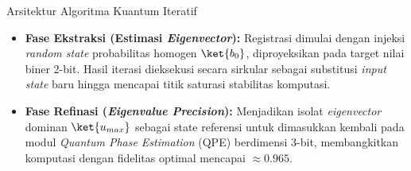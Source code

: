 \begin{frame}{Arsitektur Algoritma Kuantum Iteratif}
    \begin{itemize}
        \item \textbf{Fase Ekstraksi (Estimasi \textit{Eigenvector}):} Registrasi dimulai dengan injeksi \textit{random state} probabilitas homogen $\ket{b_0}$, diproyeksikan pada target nilai biner 2-bit. Hasil iterasi dieksekusi secara sirkular sebagai substitusi \textit{input state} baru hingga mencapai titik saturasi stabilitas komputasi.
        \item \textbf{Fase Refinasi (\textit{Eigenvalue Precision}):} Menjadikan isolat \textit{eigenvector} dominan $\ket{u_{max}}$ sebagai state referensi untuk dimasukkan kembali pada modul \textit{Quantum Phase Estimation} (QPE) berdimensi 3-bit, membangkitkan komputasi dengan fidelitas optimal mencapai $\approx 0.965$.
    \end{itemize}
\end{frame}
